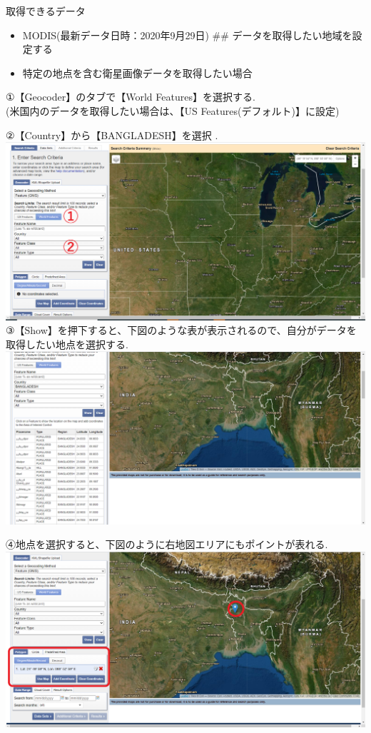 \documentclass[
]{book}
\begin{document}
取得できるデータ

\begin{itemize}
\item
  MODIS(最新データ日時：2020年9月29日)
  \#\# データを取得したい地域を設定する
\item
  特定の地点を含む衛星画像データを取得したい場合
\end{itemize}

①【Geocoder】のタブで【World Features】を選択する.\\
(米国内のデータを取得したい場合は、【US Features(デフォルト)】に設定)

②【Country】から【BANGLADESH】を選択 .\\
\includegraphics{images/area1.png}
③【Show】を押下すると、下図のような表が表示されるので、自分がデータを取得したい地点を選択する.
\includegraphics{images/table1.png}

④地点を選択すると、下図のように右地図エリアにもポイントが表れる.
\includegraphics{images/showarea.png}
\end{document}
